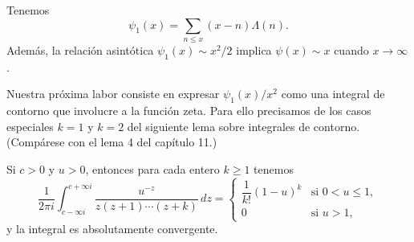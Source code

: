 \documentclass[12pt,a4paper]{book}
\begin{document}
    \begin{teorema}\label{teo:13-1}
        Tenemos
        \begin{equation}\label{eq:13-10}
            \psi_{1}(x)=\sum_{n\leq x}(x-n)\Lambda(n).
        \end{equation}
        Además, la relación asintótica $\psi_{1}(x)\sim x^{2}/2$ implica $\psi(x)\sim x$ cuando
        $x\to\infty$.
    \end{teorema}

    Nuestra próxima labor consiste en expresar $\psi_{1}(x)/x^{2}$ como una integral de contorno
    que involucre a la función zeta. Para ello precisamos de los casos especiales $k=1$ y
    $k=2$ del siguiente lema sobre integrales de contorno. (Compárese con el lema 4 del
    capítulo 11.)

    \begin{lema}\label{lem:13-3}
        Si $c>0$ y $u>0$, entonces para cada entero $k\geq1$ tenemos
        \begin{equation*}
            \frac{1}{2\pi i}\int_{c-\infty i}^{c+\infty i}\frac{u^{-z}}{z(z+1)\cdots(z+k)}\,dz=
            \begin{cases}
                \dfrac{1}{k!}(1-u)^{k}&\text{si }0<u\leq1,\\[1.5ex]
                0&\text{si }u>1,
            \end{cases}
        \end{equation*}
        y la integral es absolutamente convergente.
    \end{lema}
\end{document}
